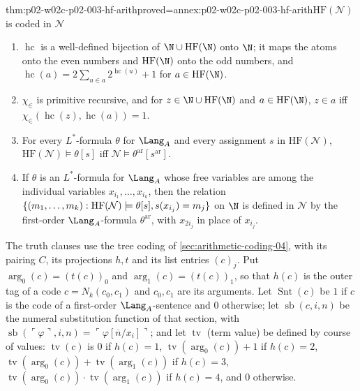\begin{hbtheorem}{thm:p02-w02c-p02-003-hf-arith}{proved=annex:p02-w02c-p02-003-hf-arith}{\(\mathrm{HF}(\mathcal N)\) is coded in \(\mathcal N\)}
\begin{enumerate}
\item \(\operatorname{hc}\) is a well-defined bijection of
      \(\N\cup\mathrm{HF}(\N)\) onto \(\N\); it maps the atoms onto the even
      numbers and \(\mathrm{HF}(\N)\) onto the odd numbers, and
      \(\operatorname{hc}(a)=2\sum_{u\in a}2^{\operatorname{hc}(u)}+1\) for
      \(a\in\mathrm{HF}(\N)\).
\item \(\chi_{\in}\) is primitive recursive, and for
      \(z\in\N\cup\mathrm{HF}(\N)\) and \(a\in\mathrm{HF}(\N)\),
      \(z\in a\) iff \(\chi_{\in}(\operatorname{hc}(z),\operatorname{hc}(a))=1\).
\item For every \(L^{*}\)-formula \(\theta\) for \(\Lang_A\) and every
      assignment \(s\) in \(\mathrm{HF}(\mathcal N)\),
      \(\mathrm{HF}(\mathcal N)\models\theta[s]\) iff
      \(\mathcal N\models\theta^{\mathrm{ar}}[s^{\mathrm{ar}}]\).
\item If \(\theta\) is an \(L^{*}\)-formula for \(\Lang_A\) whose free
      variables are among the individual variables
      \(x_{i_1},\ldots,x_{i_k}\), then the relation
      \(\{(m_1,\ldots,m_k):\mathrm{HF}(\mathcal N)\models\theta[s],\\
      s(x_{i_j})=m_j\}\) on \(\N\) is defined in \(\mathcal N\) by the
      first-order \(\Lang_A\)-formula \(\theta^{\mathrm{ar}}\), with
      \(x_{2i_j}\) in place of \(x_{i_j}\).
\end{enumerate}
\end{hbtheorem}

The truth clauses use the tree coding of \cref{sec:arithmetic-coding-04},
with its pairing \(C\), its projections \(h,t\) and its list entries
\((c)_j\).  Put \(\operatorname{arg}_0(c)=(t(c))_0\) and
\(\operatorname{arg}_1(c)=(t(c))_1\), so that \(h(c)\) is the outer tag of a
code \(c=N_k(c_0,c_1)\) and \(c_0,c_1\) are its arguments.  Let
\(\operatorname{Snt}(c)\) be \(1\) if \(c\) is the code of a first-order
\(\Lang_A\)-sentence and \(0\) otherwise; let
\(\operatorname{sb}(c,i,n)\) be the numeral substitution function of that
section, with
\(\operatorname{sb}(\ulcorner\varphi\urcorner,i,n)=\ulcorner\varphi[\overline n/x_i]\urcorner\);
and let \(\operatorname{tv}\) (term value) be defined by course of values:
\(\operatorname{tv}(c)\) is \(0\) if \(h(c)=1\),
\(\operatorname{tv}(\operatorname{arg}_0(c))+1\) if \(h(c)=2\),
\(\operatorname{tv}(\operatorname{arg}_0(c))+\operatorname{tv}(\operatorname{arg}_1(c))\)
if \(h(c)=3\),
\(\operatorname{tv}(\operatorname{arg}_0(c))\cdot\operatorname{tv}(\operatorname{arg}_1(c))\)
if \(h(c)=4\), and \(0\) otherwise.

